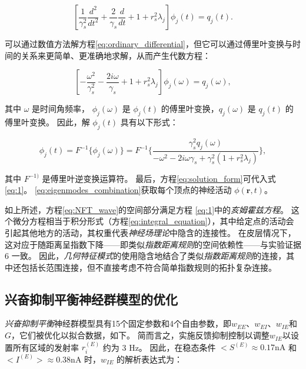 \documentclass[lang=cn,a4paper,newtx]{elegantpaper}
\begin{document}
\begin{equation}\label{eq:ordinary_differential}
	[
		\frac{1}{\gamma _s^2}
		\frac{d^2}{dt^2}
		+
		\frac{2}{\gamma _s}
		\frac{d}{dt}
		+ 1 + r_s^2 \lambda_j
	]
	\phi_j(t) 
	=
	q_j(t).
\end{equation}


可以通过数值方法解方程\ref{eq:ordinary_differential}，但它可以通过傅里叶变换与时间的关系来更简单、更准确地求解，从而产生代数方程：

\begin{equation}\label{eq:algebraic_equation}
	[
		- \frac{\omega ^2}{\gamma_s^2}
		- \frac{2 i \omega}{\gamma_s}
		+ 1
		+ r_s^2 \lambda_j
	]
	\phi_j(\omega)
	=
	q_j(\omega),
\end{equation}

其中 $ ω $ 是时间角频率， $ \phi_j (\omega) $ 是 $ \phi_j (t) $ 的傅里叶变换，$ q_j (\omega) $ 是 $ q_j (t) $ 的傅里叶变换。 因此，解 $ \phi_j (t) $ 具有以下形式：

\begin{equation}\label{eq:solution_form}
	\phi_j(t)
	=
	F^{-1} \{\phi_j(\omega)\}
	=
	F^{-1}
	\{
		\frac{
				\gamma_s^2 q_j(\omega)
			 }
		 	 {
		 	 	- \omega^2
		 	 	- 2 i \omega \gamma_s
		 	 	+ \gamma_s^2
		 	 		(1 + r_s^2 \lambda_j)
		 	 }
	\},
\end{equation}

其中 $ F^{-1)} $ 是傅里叶逆变换运算符。
最后，方程\ref{eq:solution_form}可代入式\ref{eq:1}。
\ref{eq:eigenmodes_combination}获取每个顶点的神经活动 $ \phi(\boldsymbol{r},t) $。



如上所述，方程\ref{eq:NFT_wave}的空间部分满足方程 \ref{eq:1}中的\textit{亥姆霍兹方程}。
这个微分方程相当于积分形式（方程\ref{eq:integral_equation}），其中给定点的活动会引起其他地方的活动，其权重代表\textit{神经场理论}中隐含的连接性。
在皮层情况下，这对应于随距离呈指数下降——即类似\textit{指数距离规则}的空间依赖性——与实验证据 6 一致。
因此，\textit{几何特征模式}的使用隐含地结合了类似\textit{指数距离规则}的连接，其中还包括长范围连接，但不直接考虑不符合简单指数规则的拓扑复杂连接。



\subsection{兴奋抑制平衡神经群模型的优化} \label{sec:mass_optimization}

\textit{兴奋抑制平衡}神经群模型具有15个固定参数和4个自由参数，即$ w_{EE} $、$ w_{EI} $、$ w_{IE} $和 $ G $，它们被优化以拟合数据，如下\cite{rosen2022estimation}。
简而言之，实施反馈抑制控制\cite{van2012high}以调整$ w_{IE} $以设置所有区域的发射率 $ r_i^{(E)} $ 约为 3 Hz。
因此，在稳态条件 $ <S^{(E)} \approx 0.17 \text{nA} $ 和 $ <I^{(E)}> \approx 0.38 \text{nA} $ 时，$ w_{IE} $ 的解析表达式为：
\end{document}
